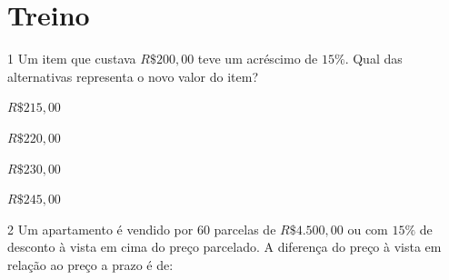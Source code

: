 
\section*{Treino}

\num{1} Um item que custava $R\$200,00$ teve um acréscimo de $15\%$. Qual das
alternativas representa o novo valor do item?

\begin{multicols}{4}
\begin{escolha}[itemsep=0pt]
  \item $R\$ 215,00$
  \item $R\$ 220,00$
  \item $R\$ 230,00$ 
  \item $R\$ 245,00$
\end{escolha}
\end{multicols}



\num{2} Um apartamento é vendido por 60 parcelas de $R\$4.500,00$ ou com
$15\%$ de desconto à vista em cima do preço parcelado. A diferença do
preço à vista em relação ao preço a prazo é de:

